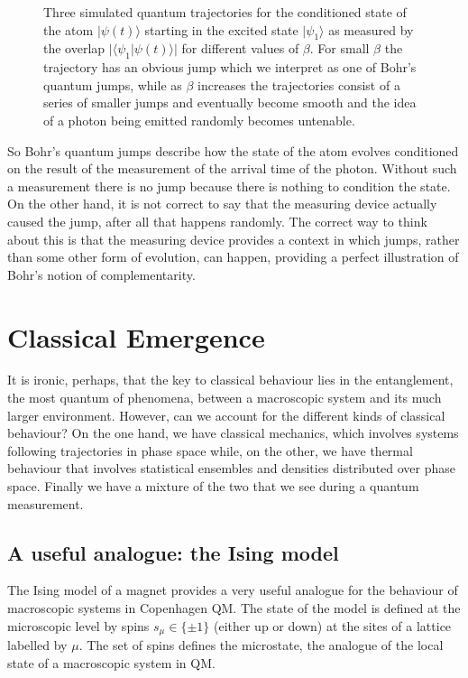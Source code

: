 \documentclass[12pt]{article}
\theoremstyle{plain}
\theoremstyle{definition}
\theoremstyle{remark}
\def\bra#1{\langle #1|}
\def\ket#1{| #1\rangle}
\begin{document}
\begin{figure}[ht]
\begin{center}
\end{center}
\caption{Three simulated quantum trajectories for the conditioned state of the atom $\ket{\psi(t)}$ starting in the excited state $\ket{\psi_1}$ as measured by the overlap $\big|\bra{\psi_1}\psi(t)\rangle\big|$ for different values of $\beta$. For small $\beta$ the trajectory has an obvious jump which we interpret as one of Bohr's quantum jumps, while as $\beta$ increases the trajectories consist of a series of smaller jumps and eventually become smooth and the idea of a photon being emitted randomly becomes untenable.}
\label{f9}
\end{figure}


So Bohr's quantum jumps describe how the state of the atom evolves conditioned on the result of the measurement of the arrival time of the photon. Without such a measurement there is no jump because there is nothing to condition the state. On the other hand, it is not correct to say that the measuring device actually caused the jump, after all that happens randomly. The correct way to think about this is that the measuring device provides a context in which jumps, rather than some other form of evolution, can happen, providing a perfect illustration of Bohr's notion of complementarity.

\section{Classical Emergence}\label{s8}

It is ironic, perhaps, that the key to classical behaviour lies in the entanglement, the most quantum of phenomena, between a macroscopic system and its much larger environment. However, can we account for the different kinds of classical behaviour? On the one hand, we have classical mechanics, which involves systems following trajectories in phase space while, on the other, we have thermal behaviour that involves statistical ensembles and densities distributed over phase space. Finally we have a mixture of the two that we see during a quantum measurement.

\subsection{A useful analogue: the Ising model}\label{s8.1}

The Ising model of a magnet provides a very useful analogue for the behaviour of macroscopic systems in Copenhagen QM. The state of the model is defined at the microscopic level by spins $s_\mu\in\{\pm1\}$ (either up or down) at the sites of a lattice labelled by $\mu$. The set of spins defines the microstate, the analogue of the local state of a macroscopic system in QM.
\end{document}
